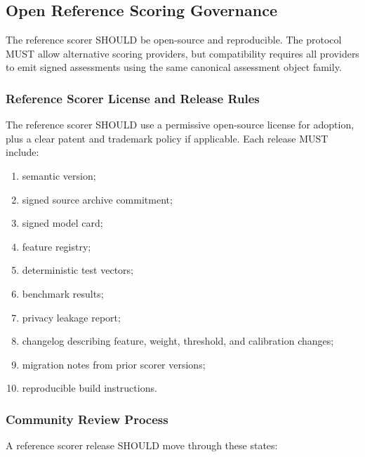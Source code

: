 \documentclass[11pt]{article}
\begin{document}
\subsection{Open Reference Scoring Governance}

The reference scorer SHOULD be open-source and reproducible. The protocol MUST allow alternative scoring providers, but compatibility requires all providers to emit signed assessments using the same canonical assessment object family.

\subsubsection{Reference Scorer License and Release Rules}

The reference scorer SHOULD use a permissive open-source license for adoption, plus a clear patent and trademark policy if applicable. Each release MUST include:

\begin{enumerate}
    \item semantic version;
    \item signed source archive commitment;
    \item signed model card;
    \item feature registry;
    \item deterministic test vectors;
    \item benchmark results;
    \item privacy leakage report;
    \item changelog describing feature, weight, threshold, and calibration changes;
    \item migration notes from prior scorer versions;
    \item reproducible build instructions.
\end{enumerate}

\subsubsection{Community Review Process}

A reference scorer release SHOULD move through these states:
\end{document}

